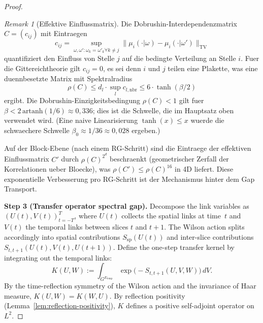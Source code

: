 \documentclass[12pt,a4paper]{article}
\theoremstyle{definition}
\theoremstyle{plain}
\theoremstyle{remark}
\newtheorem{remark}[definition]{Remark}
\begin{document}
\begin{proof}
\begin{remark}[Effektive Einflussmatrix]
\label{rem:influence-matrix}
Die Dobrushin-Interdependenzmatrix $C = (c_{ij})$ mit Eintraegen
\[
c_{ij} = \sup_{\omega, \omega': \omega_k = \omega'_k \forall k \neq j} \| \mu_i(\cdot | \omega) - \mu_i(\cdot | \omega') \|_{\mathrm{TV}}
\]
quantifiziert den Einfluss von Stelle $j$ auf die bedingte Verteilung an Stelle $i$. Fuer die Gittereichtheorie gilt $c_{ij} = 0$, es sei denn $i$ und $j$ teilen eine Plakette, was eine duennbesetzte Matrix mit Spektralradius
\[
\rho(C) \leq d_l \cdot \sup_{l} c_{l, \mathrm{nbr}} \leq 6 \cdot \tanh(\beta/2)
\]
ergibt. Die Dobrushin-Einzigkeitsbedingung $\rho(C) < 1$ gilt fuer $\beta < 2\,\mathrm{artanh}(1/6) \approx 0{,}336$; dies ist die Schwelle, die im Hauptsatz oben verwendet wird. (Eine naive Linearisierung $\tanh(x) \leq x$ wuerde die schwaechere Schwelle $\beta_0 \approx 1/36 \approx 0{,}028$ ergeben.)

Auf der Block-Ebene (nach einem RG-Schritt) sind die Eintraege der effektiven Einflussmatrix $C'$ durch $\rho(C)^{2^d}$ beschraenkt (geometrischer Zerfall der Korrelationen ueber Bloecke), was $\rho(C') \leq \rho(C)^{16}$ in 4D liefert. Diese exponentielle Verbesserung pro RG-Schritt ist der Mechanismus hinter dem Gap Transport.
\end{remark}

\medskip
\noindent\textbf{Step 3 (Transfer operator spectral gap).}
Decompose the link variables as $(U(t), V(t))_{t=-T}^T$, where $U(t)$ collects the spatial links at time~$t$ and $V(t)$ the temporal links between slices $t$ and $t+1$. The Wilson action splits accordingly into spatial contributions $S_{\mathrm{sp}}(U(t))$ and inter-slice contributions $S_{t,t+1}(U(t), V(t), U(t+1))$. Define the one-step transfer kernel by integrating out the temporal links:
\begin{equation}\label{eq:transfer-kernel}
    K(U, W) := \int_{G^{E_{\mathrm{temp}}}} \exp\!\bigl(-S_{t,t+1}(U, V, W)\bigr)\,dV.
\end{equation}
By the time-reflection symmetry of the Wilson action and the invariance of Haar measure, $K(U,W) = K(W,U)$. By reflection positivity (Lemma~\ref{lem:reflection-positivity}), $K$ defines a positive self-adjoint operator on $L^2$.


\end{proof}
\end{document}
